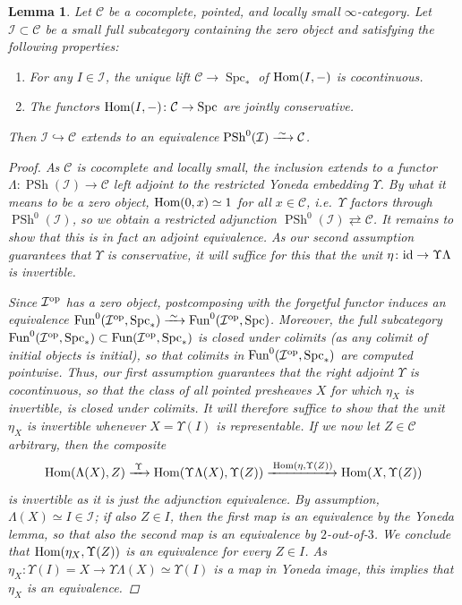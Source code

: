 \documentclass[reqno]{memo-l}
\theoremstyle{mythm}
\newtheorem{lemma}[thm]{Lemma}
\theoremstyle{definition}
\numberwithin{equation}{section}
\newcommand{\Cc}{{\mathcal{C}}}
\newcommand{\Ii}{{\mathcal{I}}}
\DeclareMathOperator{\Spc}{Spc}
\renewcommand{\hom}{\textup{hom}}
\newcommand{\Fun}{{\textup{Fun}}}
\DeclareMathOperator{\PSh}{PSh}
\newcommand{\op}{{\textup{op}}}
\renewcommand{\hom}{{\textup{Hom}}}
\newcommand{\id}{\textup{id}}
\newcommand{\iso}{\xrightarrow{\;\smash{\raisebox{-0.25ex}{\ensuremath{\scriptstyle\sim}}}\;}}
\begin{document}
\begin{lemma}\label{lemma:detect-pointed-presheaves}
    Let $\Cc$ be a cocomplete, pointed, and locally small $\infty$-category. Let $\Ii\subset\Cc$ be a small full subcategory containing the zero object and satisfying the following properties:
    \begin{enumerate}
        \item For any $I\in\Ii$, the unique lift $\Cc\to\Spc_*$ of $\hom(I,-)$ is cocontinuous.
        \item The functors $\hom(I,-)\colon\Cc\to\Spc$ are jointly conservative.
    \end{enumerate}
    Then $\Ii\hookrightarrow\Cc$ extends to an equivalence $\PSh^0(\Ii)\iso\Cc$.
    \begin{proof}
        As $\Cc$ is cocomplete and locally small, the inclusion extends to a functor $\Lambda\colon\PSh(\Ii)\to\Cc$ left adjoint to the restricted Yoneda embedding $\Upsilon$. By what it means to be a zero object, $\hom(0,x)\simeq1$ for all $x\in\Cc$, i.e.\ $\Upsilon$ factors through $\PSh^0(\Ii)$, so we obtain a restricted adjunction $\PSh^0(\Ii)\rightleftarrows\Cc$. It remains to show that this is in fact an adjoint equivalence. As our second assumption guarantees that $\Upsilon$ is conservative, it will suffice for this that the unit $\eta\colon\id\to\Upsilon\Lambda$ is invertible. 

        Since $\Ii^\op$ has a zero object, postcomposing with the forgetful functor induces an equivalence $\Fun^0(\Ii^\op,\Spc_*)\iso\Fun^0(\Ii^\op,\Spc)$. Moreover, the full subcategory $\Fun^0(\Ii^\op,\Spc_*)\subset\Fun(\Ii^\op,\Spc_*)$ is closed under colimits (as any colimit of initial objects is initial), so that colimits in $\Fun^0(\Ii^\op,\Spc_*)$ are computed pointwise. Thus, our first assumption guarantees that the right adjoint $\Upsilon$ is cocontinuous, so that the class of all pointed presheaves $X$ for which $\eta_X$ is invertible, is closed under colimits. It will therefore suffice to show that the unit $\eta_X$ is invertible whenever $X=\Upsilon(I)$ is representable. If we now let $Z\in\Cc$ arbitrary, then the composite
        \[
            \hom(\Lambda(X),Z)\xrightarrow{\;\Upsilon\;}\hom(\Upsilon\Lambda(X),\Upsilon(Z))\xrightarrow{\;\hom(\eta,\Upsilon(Z))} \hom(X,\Upsilon(Z))
        \]
        is invertible as it is just the adjunction equivalence. By assumption, $\Lambda(X)\simeq I\in\Ii$; if also $Z\in I$, then the first map is an equivalence by the Yoneda lemma, so that also the second map is an equivalence by $2$-out-of-$3$. We conclude that $\hom(\eta_X,\Upsilon(Z))$ is an equivalence for every $Z\in I$. As $\eta_X\colon \Upsilon(I)=X\to \Upsilon\Lambda(X)\simeq\Upsilon(I)$ is a map in Yoneda image, this implies that $\eta_X$ is an equivalence.
    \end{proof}
\end{lemma}
\end{document}
